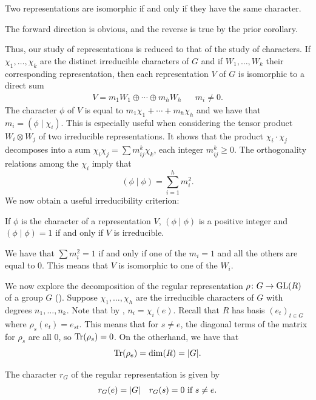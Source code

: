 \documentclass[letterpaper, 11pt, oneside]{book}
\begin{document}
\clearpage

\begin{cor}
  Two representations are isomorphic if and only if they have the same character.
\end{cor}
\begin{pf}
  The forward direction is obvious, and the reverse is true by the prior corollary.
\end{pf}

Thus, our study of representations is reduced to that of the study of characters.
If $\chi_{1}, \ldots, \chi_{k}$ are the distinct irreducible characters of $G$  and if $W_{1}, \ldots, W_{k}$ their corresponding representation, then each representation $V$ of $G$ is isomorphic to a direct sum
\begin{align*}
  V = m_{1}W_{1} \oplus \cdots \oplus m_{h}W_{h} && m_{i} \neq 0.
\end{align*}
The character $\phi$ of $V$ is equal to $m_{1}\chi_{1} + \cdots + m_{h}\chi_{h}$ and we have that $m_{i} = (\phi \mid \chi_{i})$.
This is especially useful when considering the tensor product $W_{i} \otimes W_{j}$ of two irreducible representations.
It shows that the product $\chi_{i} \cdot \chi_{j}$ decomposes into a sum $\chi_{i} \chi_{j} = \sum m_{ij}^{k} \chi_{k}$, each integer $m_{ij}^{k} \geq 0$.
The orthogonality relations among the $\chi_{i}$ imply that
\[
  (\phi \mid \phi) = \sum_{i = 1}^{h} m_{i}^{2}.
\]
We now obtain a useful irreducibility criterion:
\begin{thrm}\label{thrm:irreducibility_criterion}
  If $\phi$ is the character of a representation $V$, $(\phi \mid \phi)$ is a positive integer and $(\phi \mid \phi) = 1$ if and only if $V$ is irreducible.
\end{thrm}
\begin{pf}
  We have that $\sum m_{i}^{2} = 1$ if and only if one of the $m_{i} = 1$ and all the others are equal to $0$.
  This means that $V$ is isomorphic to one of the $W_{i}$.
\end{pf}

We now explore the decomposition of the regular representation $\rho\colon G \to \operatorname{GL}(R)$ of a group $G$ ().
Suppose $\chi_{1}, \ldots, \chi_{h}$ are the irreducible characters of $G$ with degrees $n_{1}, \ldots, n_{k}$.
Note that by , $n_{i} = \chi_{i}(e)$.
Recall that $R$ has basis $(e_{t})_{t \in G}$ where $\rho_{s}(e_{t}) = e_{st}$.
This means that for $s \neq e$, the diagonal terms of the matrix for $\rho_{s}$ are all $0$, so $\Tr(\rho_{s}) = 0$.
On the otherhand, we have that
\[
  \Tr(\rho_{e}) = \dim(R) = \abs{G}.
\]
\begin{prop}\label{prop:char_reg_rep}
  The character $r_{G}$ of the regular representation is given by
  \begin{align*}
    r_{G}(e) = \abs{G} && r_{G}(s) = 0 \text{ if } s \neq e.
  \end{align*}
\end{prop}
\end{document}

